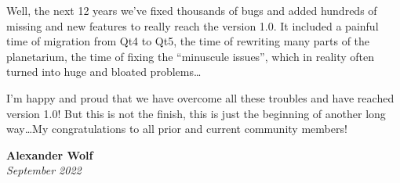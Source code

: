 Well, the next 12 years we've fixed thousands of bugs and added
hundreds of missing and new features to really reach the version
1.0. It included a painful time of migration from Qt4 to Qt5, the time
of rewriting many parts of the planetarium, the time of fixing the
``minuscule issues'', which in reality often turned into huge and
bloated problems\ldots

I'm happy and proud that we have overcome all these troubles and have
reached version 1.0! But this is not the finish, this is just the
beginning of another long way\ldots My congratulations to all prior
and current community members!

\begin{flushright}
\textbf{Alexander Wolf} \\ \emph{September 2022}
\end{flushright}


